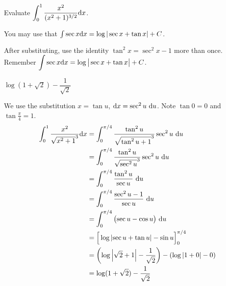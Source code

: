 \begin{question}
Evaluate $\displaystyle\int_0^1\dfrac{x^2}{(x^2+1)^{3/2}}\mathrm{d}x$.

You may use that  $\int \sec x\mathrm{d}x = \log|\sec x+\tan x| +C$.
\end{question}
\begin{hint}
After substituting, use the identity $\tan^2 x = \sec^2 x - 1$ more than once.\\
 Remember $\displaystyle\int \sec x \mathrm{d}x = \log \big|\sec x + \tan x \big|+C$.
\end{hint}
\begin{answer}
$\log(1+\sqrt{2})-\dfrac{1}{\sqrt{2}}$
\end{answer}
\begin{solution}
We use the substitution $x=\tan u$, $\mathrm{d}x=\sec^2 u~\mathrm{d}u$. Note $\tan 0=0$ and $\tan \frac{\pi}{4} =1$.
\begin{align*}
\displaystyle\int_0^1\dfrac{x^2}{\sqrt{x^2+1}^3}\mathrm{d}x&=
\int_0^{\pi/4}\dfrac{\tan^2 u}{\sqrt{\tan^2 u +1}^3}\sec^2u~\mathrm{d}u\\
&=
\int_0^{\pi/4}\dfrac{\tan^2 u}{\sqrt{\sec^2u}^3}\sec^2u~\mathrm{d}u\\
&=
\int_0^{\pi/4}\frac{\tan^2 u}{\sec u}~\mathrm{d}u\\&=
\int_0^{\pi/4}\frac{\sec^2 u-1}{\sec u}~\mathrm{d}u\\&=
\int_0^{\pi/4}\big({\sec u}-\cos u\big)~\mathrm{d}u\\
&=\Big[\log\left|\sec u + \tan u \right| - \sin u\Big]_{0}^{\pi/4}
\\
&=\left(\log\left|\sqrt{2} + 1 \right| -\frac{1}{\sqrt{2}}\right) - 
\left(\log|1+0|-0\right)\\
&=\log(1+\sqrt{2})-\frac{1}{\sqrt{2}}
\end{align*}
\end{solution}


